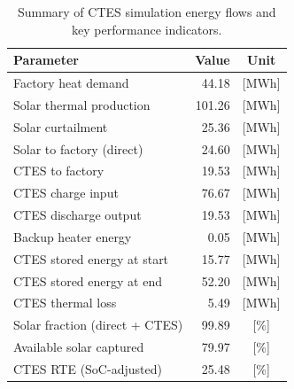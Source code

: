 \renewcommand{\arraystretch}{1.2}
\begin{table}[h]
\centering
\begin{tabular}{l|r c}
\hline
Parameter & Value & Unit \\
\hline
Factory heat demand & 44.18 & [MWh] \\
Solar thermal production & 101.26 & [MWh] \\
Solar curtailment & 25.36 & [MWh] \\
Solar to factory (direct) & 24.60 & [MWh] \\
CTES to factory & 19.53 & [MWh] \\
CTES charge input & 76.67 & [MWh] \\
CTES discharge output & 19.53 & [MWh] \\
Backup heater energy & 0.05 & [MWh] \\
CTES stored energy at start & 15.77 & [MWh] \\
CTES stored energy at end & 52.20 & [MWh] \\
CTES thermal loss & 5.49 & [MWh] \\
\hline
Solar fraction (direct + CTES) & 99.89 & [\%] \\
Available solar captured & 79.97 & [\%] \\
CTES RTE (SoC-adjusted) & 25.48 & [\%] \\
\hline
\end{tabular}
\caption{Summary of CTES simulation energy flows and key performance indicators.}
\label{tab:ctes-simulation-summary}
\end{table}
